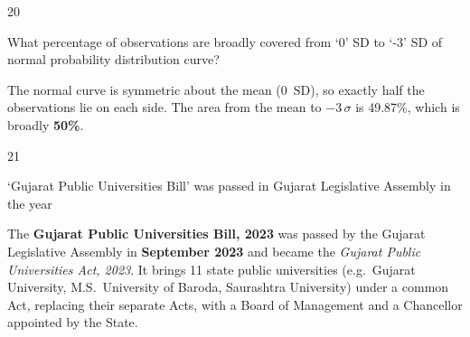 \begin{question}{20}
{What percentage of observations are broadly covered from `0' SD to `-3' SD of normal probability distribution curve?\par}
\begin{explain}
The normal curve is symmetric about the mean (0~SD), so exactly half the observations lie on each side. The area from the mean to $-3\,\sigma$ is 49.87\%, which is broadly \textbf{50\%}.
\begin{center}
\end{center}
\end{explain}
\end{question}

\begin{question}{21}
{`Gujarat Public Universities Bill' was passed in Gujarat Legislative Assembly in the year\par}
\begin{explain}
The \textbf{Gujarat Public Universities Bill, 2023} was passed by the Gujarat Legislative Assembly in \textbf{September 2023} and became the \emph{Gujarat Public Universities Act, 2023}. It brings 11 state public universities (e.g.\ Gujarat University, M.S.~University of Baroda, Saurashtra University) under a common Act, replacing their separate Acts, with a Board of Management and a Chancellor appointed by the State.
\end{explain}
\end{question}

